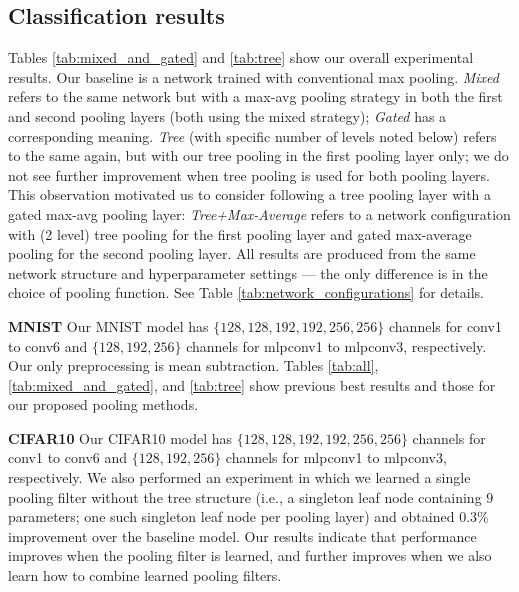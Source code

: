 \documentclass[twoside]{article}
\begin{document}
\vspace{-4mm}
\subsection{Classification results}
\vspace{-3mm}
Tables \ref{tab:mixed_and_gated} and \ref{tab:tree} show our overall experimental results. Our baseline is a
network trained with conventional max pooling. \emph{Mixed} refers 
to the same network but with a max-avg pooling strategy in both the first and second 
pooling layers (both using the mixed strategy); \emph{Gated} has a corresponding meaning.
\emph{Tree} (with specific number of levels noted below) refers to the same again, but with our tree 
pooling in the first pooling layer only; we do not see further improvement when tree pooling is 
used for both pooling layers.  This observation motivated us to consider following a tree pooling 
layer with a gated max-avg pooling layer: \emph{Tree+Max-Average} refers to a network 
configuration with (2 level) tree pooling for the first pooling layer and gated max-average pooling 
for the second pooling layer. 
All results are produced from the same network structure 
and hyperparameter settings --- the only difference is in the choice of pooling function. 
See Table \ref{tab:network_configurations} for details.


\textbf{MNIST}
Our MNIST model has $\{128,\allowbreak 128,\allowbreak 192,\allowbreak 192,\allowbreak 256,\allowbreak 256\}$ channels 
for conv1 to conv6 and $\{128,\allowbreak 192,\allowbreak 256\}$ channels for mlpconv1 to mlpconv3, respectively. 
Our only preprocessing is mean subtraction. Tables \ref{tab:all},\ref{tab:mixed_and_gated}, and \ref{tab:tree} show previous 
best results and those for our proposed pooling methods. 


\textbf{CIFAR10}
Our CIFAR10 model has $\{128,\allowbreak 128,\allowbreak 192,\allowbreak 192,\allowbreak 256,\allowbreak 256\}$ channels for conv1 to conv6 
and $\{128,\allowbreak 192,\allowbreak 256\}$ channels for mlpconv1 to mlpconv3, respectively. 
We also performed an experiment in which we learned a single pooling filter
without the tree structure (i.e., a singleton leaf node containing $9$ parameters; 
one such singleton leaf node per pooling layer) and obtained $0.3\%$ improvement over 
the baseline model. Our results indicate that performance improves when the pooling filter 
is learned, and further improves when we also learn how to combine learned pooling filters.
\end{document}
